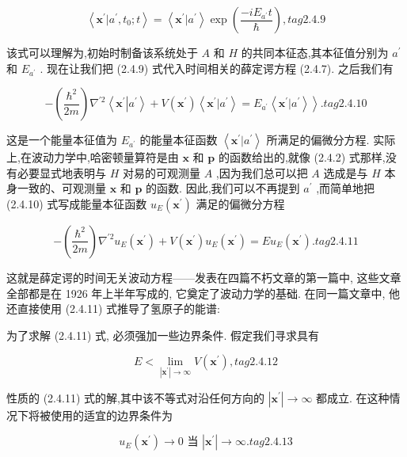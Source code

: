 \documentclass[lang=cn,newtx,10pt,scheme=chinese,thmcnt=section]{elegantbook}
\begin{document}
$$
\left\langle {{\mathbf{x}}^{\prime } | {a}^{\prime },{t}_{0};t}\right\rangle = \left\langle {{\mathbf{x}}^{\prime } | {a}^{\prime }}\right\rangle \exp \left( \frac{-i{E}_{{a}^{\prime }}t}{\hbar }\right) , tag{2.4.9}
$$

该式可以理解为,初始时制备该系统处于 $A$ 和 $H$ 的共同本征态,其本征值分别为 ${a}^{\prime }$ 和 ${E}_{{a}^{\prime }}$ . 现在让我们把 (2.4.9) 式代入时间相关的薛定谔方程 (2.4.7). 之后我们有

$$
- \left( \frac{{\hbar }^{2}}{2m}\right) {\nabla }^{\prime 2}\left\langle {{\mathbf{x}}^{\prime }\left| {a}^{\prime }\right\rangle + V\left( {\mathbf{x}}^{\prime }\right) \left\langle {{\mathbf{x}}^{\prime } | {a}^{\prime }}\right\rangle = {E}_{{a}^{\prime }}\left\langle {{\mathbf{x}}^{\prime } | {a}^{\prime }}\right\rangle }\right\rangle . tag{2.4.10}
$$

这是一个能量本征值为 ${E}_{{a}^{\prime }}$ 的能量本征函数 $\left\langle {{\mathbf{x}}^{\prime } | {a}^{\prime }}\right\rangle$ 所满足的偏微分方程. 实际上,在波动力学中,哈密顿量算符是由 $\mathbf{x}$ 和 $\mathbf{p}$ 的函数给出的,就像 (2.4.2) 式那样,没有必要显式地表明与 $H$ 对易的可观测量 $A$ ,因为我们总可以把 $A$ 选成是与 $H$ 本身一致的、可观测量 $\mathbf{x}$ 和 $\mathbf{p}$ 的函数. 因此,我们可以不再提到 ${a}^{\prime }$ ,而简单地把 (2.4.10) 式写成能量本征函数 ${u}_{E}\left( {\mathbf{x}}^{\prime }\right)$ 满足的偏微分方程

$$
- \left( \frac{{\hbar }^{2}}{2m}\right) {\nabla }^{\prime 2}{u}_{E}\left( {\mathbf{x}}^{\prime }\right) + V\left( {\mathbf{x}}^{\prime }\right) {u}_{E}\left( {\mathbf{x}}^{\prime }\right) = E{u}_{E}\left( {\mathbf{x}}^{\prime }\right) . tag{2.4.11}
$$

这就是薛定谔的时间无关波动方程——发表在四篇不朽文章的第一篇中, 这些文章全部都是在 1926 年上半年写成的, 它奠定了波动力学的基础. 在同一篇文章中, 他还直接使用 (2.4.11) 式推导了氢原子的能谱:

为了求解 (2.4.11) 式, 必须强加一些边界条件. 假定我们寻求具有

$$
E < \mathop{\lim }\limits_{{\left| {\mathbf{x}}^{\prime }\right| \rightarrow \infty }}V\left( {\mathbf{x}}^{\prime }\right) , tag{2.4.12}
$$

性质的 (2.4.11) 式的解,其中该不等式对沿任何方向的 $\left| {\mathbf{x}}^{\prime }\right| \rightarrow \infty$ 都成立. 在这种情况下将被使用的适宜的边界条件为

$$
{u}_{E}\left( {\mathbf{x}}^{\prime }\right) \rightarrow 0\text{ 当 }\left| {\mathbf{x}}^{\prime }\right| \rightarrow \infty . tag{2.4.13}
$$
\end{document}
